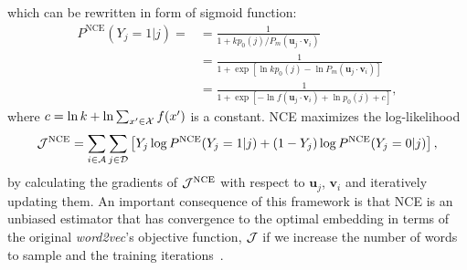 \documentclass[12pt,draft,a4paper]{article}
\newcommand{\vect}[1]{\boldsymbol{#1}}
\begin{document}
which can be rewritten in form of sigmoid function:
\begin{align}
	\label{eq:nce}
	P^{\text{NCE}}\left(Y_{j}=1 \vert j\right) =
	 & = \frac{
		1
	}{
		1 + kp_0(j) / P_m(\vect{u}_j \cdot \vect{v}_{i})
	}           \\
	 & = \frac{
		1
	}{
		1 + \exp\left[ \ln kp_0(j) - \ln P_m(\vect{u}_j \cdot \vect{v}_{i}) \right]
	}           \\
	 & = \frac{
		1
	}{
		1 + \exp\left[ - \ln f(\vect{u}_j \cdot \vect{v}_{i})  + \ln p_0(j) + c \right]
	},
\end{align}
where $c = \ln k + \ln\sum_{ x' \in {\cal X}} f(x') $ is a constant.
NCE maximizes the log-likelihood
\begin{align}
	\label{eq:log-likelihood-logistic-regress}
	{\cal J}^{\text{NCE}} = \sum_{i \in {\cal A}}\sum_{j \in {\cal D}} \left[ Y_{j} \log P^{\text{NCE}}(Y_{j} = 1\vert j) + (1-Y_{j}) \log P^{\text{NCE}}(Y_{j} = 0 \vert j)\right],
\end{align}
by calculating the gradients of ${\cal J}^{\text{NCE}}$ with respect to $\vect{u}_j$, $\vect{v}_{i}$ and iteratively updating them.
An important consequence of this framework is that NCE is an unbiased estimator that has convergence to the optimal embedding in terms of the original {\it word2vec}'s objective function, ${\cal J}$ if we increase the number of words to sample and the training iterations~\autocite{Chia2010,Dyer2014}.
\end{document}
